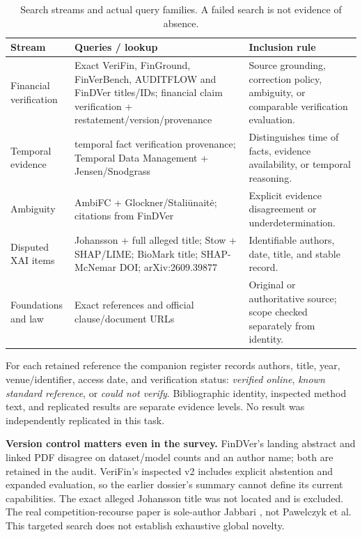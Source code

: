 \documentclass[11pt,a4paper]{article}
\newcommand{\lead}[1]{\textbf{\color{navy}#1}}
\begin{document}
\begin{table}[H]\small\centering
\caption{Search streams and actual query families. A failed search is not evidence of absence.}
\begin{tabularx}{\linewidth}{p{31mm}YY}\toprule
Stream & Queries / lookup & Inclusion rule\\\midrule
Financial verification & Exact VeriFin, FinGround, FinVerBench, AUDITFLOW and FinDVer titles/IDs; financial claim verification + restatement/version/provenance & Source grounding, correction policy, ambiguity, or comparable verification evaluation.\\
Temporal evidence & temporal fact verification provenance; Temporal Data Management + Jensen/Snodgrass & Distinguishes time of facts, evidence availability, or temporal reasoning.\\
Ambiguity & AmbiFC + Glockner/Staliūnaitė; citations from FinDVer & Explicit evidence disagreement or underdetermination.\\
Disputed XAI items & Johansson + full alleged title; Stow + SHAP/LIME; BioMark title; SHAP-McNemar DOI; arXiv:2609.39877 & Identifiable authors, date, title, and stable record.\\
Foundations and law & Exact references and official clause/document URLs & Original or authoritative source; scope checked separately from identity.\\\bottomrule
\end{tabularx}\end{table}

For each retained reference the companion register records authors, title, year, venue/identifier, access date, and verification status: \emph{verified online}, \emph{known standard reference}, or \emph{could not verify}. Bibliographic identity, inspected method text, and replicated results are separate evidence levels. No result was independently replicated in this task.

\lead{Version control matters even in the survey.} FinDVer's landing abstract and linked PDF disagree on dataset/model counts and an author name; both are retained in the audit. VeriFin's inspected v2 includes explicit abstention and expanded evaluation, so the earlier dossier's summary cannot define its current capabilities. The exact alleged Johansson title was not located and is excluded. The real competition-recourse paper is sole-author Jabbari \cite{jabbari}, not Pawelczyk et al. This targeted search does not establish exhaustive global novelty.
\end{document}
